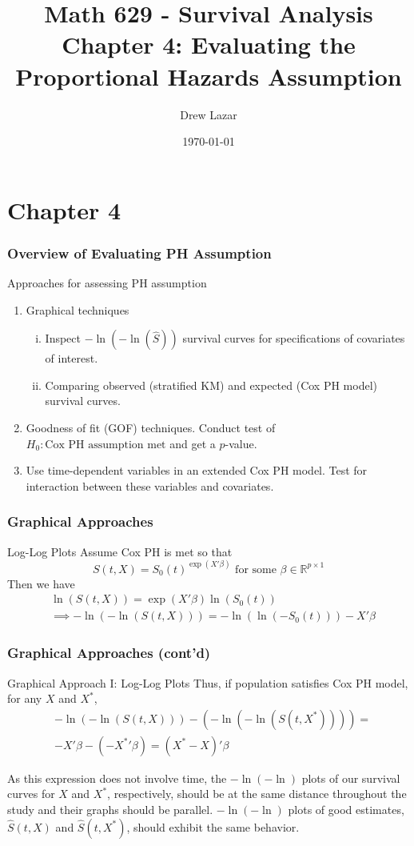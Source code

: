 \documentclass{beamer}
\title{Math 629 - Survival Analysis \\ Chapter 4: Evaluating the Proportional Hazards Assumption}
\author{Drew Lazar}
\institute{Ball State University}
\date{\today}
\theoremstyle{definition}
\begin{document}
\begin{frame}
    \titlepage
\end{frame}



\section{Chapter 4}
\begin{frame}
\frametitle{Overview of Evaluating PH Assumption}
\begin{block}{Approaches for assessing PH assumption}
\begin{enumerate}
\item Graphical techniques
\begin{enumerate}[i.]
\item Inspect $-\ln(-\ln(\hat{S}))$ survival curves for specifications of covariates of interest.
\item Comparing observed (stratified KM) and expected (Cox PH model) survival curves.
\end{enumerate}
\item Goodness of fit (GOF) techniques. Conduct test of $H_0: \text{Cox PH assumption met}$ and get a $p$-value.
\item Use time-dependent variables in an extended Cox PH model. Test for interaction between these variables and covariates.
\end{enumerate}
\end{block}
\end{frame}
\begin{frame}
\frametitle{Graphical Approaches}
\begin{block}{Log-Log Plots}
Assume Cox PH is met so that
\[ S(t,X) = S_0(t)^{\exp(X'\beta)} \text{ for some }  \beta \in \mathbb{R}^{p\times1}
\]
Then we have
\begin{align*}
&\ln( S(t,X)) = \exp(X'\beta)\ln(S_0(t)) \\
&\implies -\ln(-\ln(S(t,X))) = -\ln(\ln(-S_0(t))) - X'\beta
\end{align*}
\end{block}
\end{frame}

\begin{frame}
\frametitle{Graphical Approaches (cont'd)}
\begin{block}{Graphical Approach I: Log-Log Plots}
Thus, if population satisfies Cox PH model, for any $X$ and $X^*$,
\begin{align*}
&-\ln(-\ln(S(t,X)))- (-\ln(-\ln(S(t,X^*)))) = \\
&-X'\beta - (-{X^*}'\beta) =(X^*-X)'\beta
\end{align*}
\end{block}
As this expression does not involve time, the  $-\ln(-\ln)$ plots of our survival curves for $X$ and $X^*$, respectively, should be at the same distance throughout the study and their graphs should be parallel. $-\ln(-\ln)$ plots of good estimates, $\hat{S}(t,X)$ and $\hat{S}(t,X^*)$, should exhibit the same behavior.
\end{frame}
\end{document}
